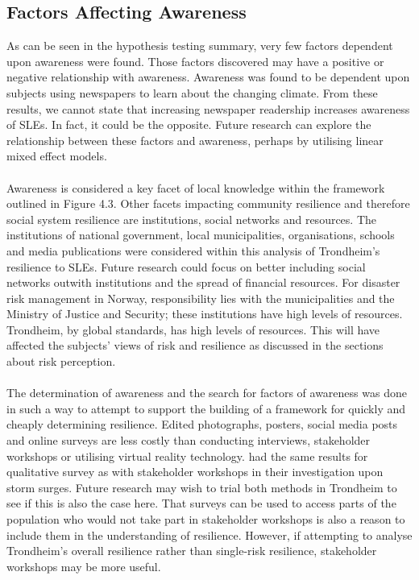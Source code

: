 \subsection{Factors Affecting Awareness}
As can be seen in the hypothesis testing summary, very few factors dependent upon awareness were found. Those factors discovered may have a positive or negative relationship with awareness. Awareness was found to be dependent upon subjects using newspapers to learn about the changing climate. From these results, we cannot state that increasing newspaper readership increases awareness of SLEs. In fact, it could be the opposite. Future research can explore the relationship between these factors and awareness, perhaps by utilising linear mixed effect models.
\paragraph{}
Awareness is considered a key facet of local knowledge within the framework outlined in Figure 4.3. Other facets impacting community resilience and therefore social system resilience are institutions, social networks and resources. The institutions of national government, local municipalities, organisations, schools and media publications were considered within this analysis of Trondheim's resilience to SLEs. Future research could focus on better including social networks outwith institutions and the spread of financial resources. For disaster risk management in Norway, responsibility lies with the municipalities and the Ministry of Justice and Security; these institutions have high levels of resources. Trondheim, by global standards, has high levels of resources. This will have affected the subjects' views of risk and resilience as discussed in the sections about risk perception. 
\paragraph{}
The determination of awareness and the search for factors of awareness was done in such a way to attempt to support the building of a framework for quickly and cheaply determining resilience. Edited photographs, posters, social media posts and online surveys are less costly than conducting interviews, stakeholder workshops or utilising virtual reality technology. \cite{gerkensmeier_governing_2018} had the same results for qualitative survey as with stakeholder workshops in their investigation upon storm surges. Future research may wish to trial both methods in Trondheim to see if this is also the case here. That surveys can be used to access parts of the population who would not take part in stakeholder workshops is also a reason to include them in the understanding of resilience. However, if attempting to analyse Trondheim's overall resilience rather than single-risk resilience, stakeholder workshops may be more useful.


